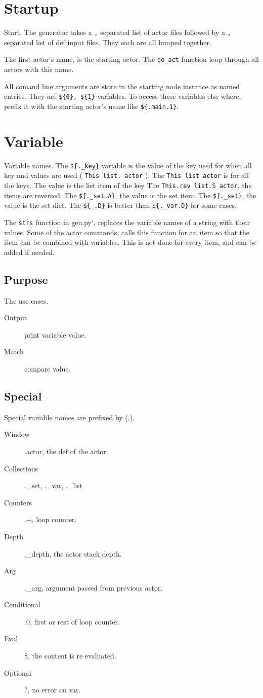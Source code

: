 \documentclass[11pt]{article}
\begin{document}
\section{Startup}
Start.
The generator takes a \texttt{,} separated list of actor files followed
by a \texttt{,} separated list of def input files. They each are all
lumped together.

The first actor's name, is the starting actor. The \texttt{go\_act}
function loop through all actors with this name.

All comand line arguments are store in the starting node instance as
named entries. They are \texttt{\$\{0\},\ \$\{1\}} variables. To access
these variables else where, prefix it with the starting actor's name
like \texttt{\$\{.main.1\}}.

\section{Variable}
Variable names.
The \texttt{\$\{.\_key\}} variable is the value of the key used for when
all key and values are used ( \texttt{This\ list.\ actor} ). The
\texttt{This\ list\ actor} is for all the keys. The value is the list
item of the key The \texttt{This.rev\ list.S\ actor}, the items are
reversed. The \texttt{\$\{.\_set.A\}}, the value is the set item. The
\texttt{\$\{.\_set\}}, the value is the set dict. The
\texttt{\$\{\_.D\}} is better than \texttt{\$\{.\_var.D\}} for some
cases.

The \texttt{strs} function in gen.py`, replaces the variable names of a
string with their values. Some of the actor commands, calls this
function for an item so that the item can be combined with variables.
This is not done for every item, and can be added if needed.

\subsection{Purpose}
The use cases.
\begin{description}
\item[Output]  print variable value.
\item[Match]  compare value.
\end{description}
\subsection{Special}
Special variable names are prefixed by (.).
\begin{description}
\item[Window]  .actor, the def of the actor.
\item[Collections]  .\_set, .\_var, .\_list
\item[Counters]  .+, loop counter.
\item[Depth]  .\_depth, the actor stack depth.
\item[Arg]  .\_arg, argument passed from previous actor.
\item[Conditional]  .0, first or rest of loop counter.
\item[Eval]  \$, the content is re evaluated.
\item[Optional]  ?, no error on var.
\end{description}
\end{document}
